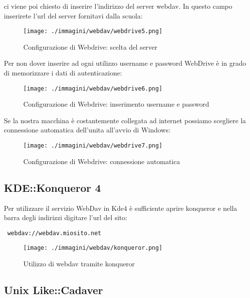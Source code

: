 ci viene poi chiesto di inserire l'indirizzo del server webdav. In questo campo inserirete l'url del server fornitavi dalla scuola:
\begin{figure}[H]
 \centering
 \texttt{[image: ./immagini/webdav/webdrive5.png]}
 \caption{Configurazione di Webdrive: scelta del server}
 \label{fig:webdrive5}
\end{figure}

Per non dover inserire ad ogni utilizzo username e password WebDrive è in grado di memorizzare i dati di autenticazione:

\begin{figure}[H]
 \centering
 \texttt{[image: ./immagini/webdav/webdrive6.png]}
 \caption{Configurazione di Webdrive: inserimento username e password}
 \label{fig:webdrive6}
\end{figure}

Se la nostra macchina è costantemente collegata ad internet possiamo scegliere la connessione automatica dell'unita all'avvio di Windows:
\begin{figure}[H]
 \centering
 \texttt{[image: ./immagini/webdav/webdrive7.png]}
 \caption{Configurazione di Webdrive: connessione automatica}
 \label{fig:webdrive7}
\end{figure}



\subsection{KDE::Konqueror 4}
Per utilizzare il servizio WebDav in Kde4 è sufficiente aprire konqueror e nella barra degli indirizzi digitare l'url del sito:
\begin{verbatim}
 webdav://webdav.miosito.net
\end{verbatim}

\begin{figure}[H]
 \centering
 \texttt{[image: ./immagini/webdav/konqueror.png]}
 \caption{Utilizzo di webdav tramite konqueror}
 \label{fig:konqueror1}
\end{figure}


\subsection{Unix Like::Cadaver}

